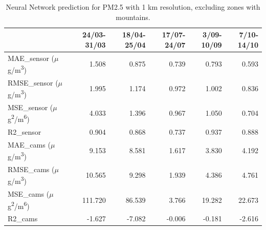 \begin{table}[H]
\begin{tabular}{lrrrrr}
\toprule
 &  24/03-31/03 &  18/04-25/04 &  17/07-24/07 &  3/09-10/09 &  7/10-14/10 \\
\midrule
 MAE\_sensor ($\mu$g/m\textsuperscript{3})&        1.508 &        0.875 &        0.739 &       0.793 &       0.593 \\
RMSE\_sensor ($\mu$g/m\textsuperscript{3})&        1.995 &        1.174 &        0.972 &       1.002 &       0.836 \\
 MSE\_sensor ($\mu$g\textsuperscript{2}/m\textsuperscript{6})&        4.033 &        1.396 &        0.967 &       1.050 &       0.704 \\
  R2\_sensor &        0.904 &        0.868 &        0.737 &       0.937 &       0.888 \\
   MAE\_cams ($\mu$g/m\textsuperscript{3})&        9.153 &        8.581 &        1.617 &       3.830 &       4.192 \\
  RMSE\_cams ($\mu$g/m\textsuperscript{3})&       10.565 &        9.298 &        1.939 &       4.386 &       4.761 \\
   MSE\_cams ($\mu$g\textsuperscript{2}/m\textsuperscript{6})&      111.720 &       86.539 &        3.766 &      19.282 &      22.673 \\
    R2\_cams &       -1.627 &       -7.082 &       -0.006 &      -0.181 &      -2.616 \\
\bottomrule
\end{tabular}
\caption{Neural Network prediction for PM2.5 with 1 km resolution, excluding zones with mountains.}
\end{table}
